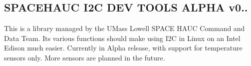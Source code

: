 \href{https://travis-ci.org/SpaceHAUC-Command-and-Data-Handling/SPACEHAUC-I2C-dev}{\tt }

\href{https://taiga.io}{\tt }

\subsection*{S\+P\+A\+C\+E\+H\+A\+UC I2C D\+EV T\+O\+O\+LS A\+L\+P\+HA v0..}

This is a library managed by the U\+Mass Lowell S\+P\+A\+CE H\+A\+UC Command and Data Team. Its various functions should make using I2C in Linux on an Intel Edison much easier. Currently in Alpha release, with support for temperature sensors only. More sensors are planned in the future.

\href{https://www.gnu.org/licenses/lgpl.txt}{\tt } 